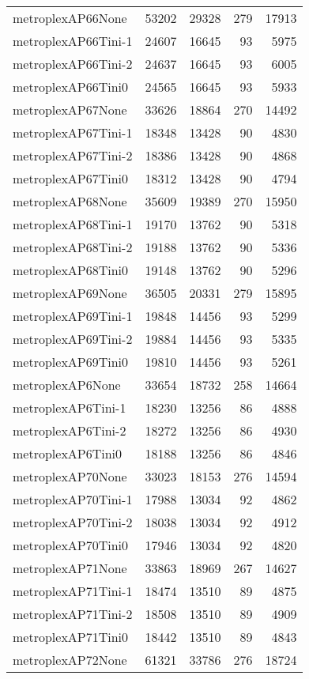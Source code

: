 \begin{longtable}{lrrrr}
metroplexAP66None & 53202 & 29328 & 279 & 17913 \\
metroplexAP66Tini-1 & 24607 & 16645 & 93 & 5975 \\
metroplexAP66Tini-2 & 24637 & 16645 & 93 & 6005 \\
metroplexAP66Tini0 & 24565 & 16645 & 93 & 5933 \\
metroplexAP67None & 33626 & 18864 & 270 & 14492 \\
metroplexAP67Tini-1 & 18348 & 13428 & 90 & 4830 \\
metroplexAP67Tini-2 & 18386 & 13428 & 90 & 4868 \\
metroplexAP67Tini0 & 18312 & 13428 & 90 & 4794 \\
metroplexAP68None & 35609 & 19389 & 270 & 15950 \\
metroplexAP68Tini-1 & 19170 & 13762 & 90 & 5318 \\
metroplexAP68Tini-2 & 19188 & 13762 & 90 & 5336 \\
metroplexAP68Tini0 & 19148 & 13762 & 90 & 5296 \\
metroplexAP69None & 36505 & 20331 & 279 & 15895 \\
metroplexAP69Tini-1 & 19848 & 14456 & 93 & 5299 \\
metroplexAP69Tini-2 & 19884 & 14456 & 93 & 5335 \\
metroplexAP69Tini0 & 19810 & 14456 & 93 & 5261 \\
metroplexAP6None & 33654 & 18732 & 258 & 14664 \\
metroplexAP6Tini-1 & 18230 & 13256 & 86 & 4888 \\
metroplexAP6Tini-2 & 18272 & 13256 & 86 & 4930 \\
metroplexAP6Tini0 & 18188 & 13256 & 86 & 4846 \\
metroplexAP70None & 33023 & 18153 & 276 & 14594 \\
metroplexAP70Tini-1 & 17988 & 13034 & 92 & 4862 \\
metroplexAP70Tini-2 & 18038 & 13034 & 92 & 4912 \\
metroplexAP70Tini0 & 17946 & 13034 & 92 & 4820 \\
metroplexAP71None & 33863 & 18969 & 267 & 14627 \\
metroplexAP71Tini-1 & 18474 & 13510 & 89 & 4875 \\
metroplexAP71Tini-2 & 18508 & 13510 & 89 & 4909 \\
metroplexAP71Tini0 & 18442 & 13510 & 89 & 4843 \\
metroplexAP72None & 61321 & 33786 & 276 & 18724 \\

\end{longtable}
